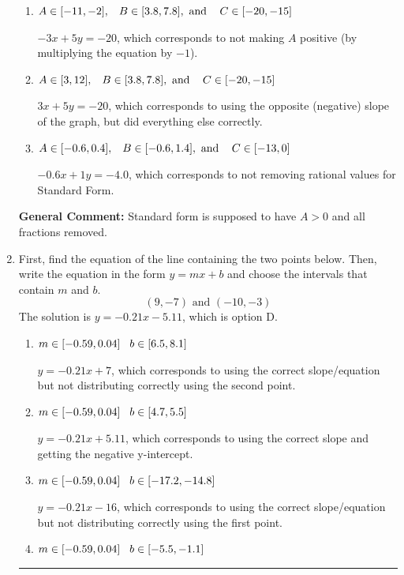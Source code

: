 \documentclass{extbook}[14pt]
\newcommand{\litem}[1]{\item #1

\rule{\textwidth}{0.4pt}}
\begin{document}
\begin{enumerate}
{\begin{enumerate}[label=\Alph*.]
 $-0.6x - 1y = 4.0$, which corresponds to using the opposite (negative) slope of the graph and not removing rational values.
\item \( A \in [-11, -2], \hspace{3mm} B \in [3.8, 7.8], \text{ and } \hspace{3mm} C \in [-20, -15] \)

 $-3x + 5y = -20$, which corresponds to not making $A$ positive (by multiplying the equation by $-1$).
\item \( A \in [3, 12], \hspace{3mm} B \in [3.8, 7.8], \text{ and } \hspace{3mm} C \in [-20, -15] \)

 $3x + 5y = -20$, which corresponds to using the opposite (negative) slope of the graph, but did everything else correctly.
\item \( A \in [-0.6, 0.4], \hspace{3mm} B \in [-0.6, 1.4], \text{ and } \hspace{3mm} C \in [-13, 0] \)

 $-0.6x + 1y = -4.0$, which corresponds to not removing rational values for Standard Form.
\end{enumerate}

\textbf{General Comment:} Standard form is supposed to have $A > 0$ and all fractions removed.
}
\litem{
First, find the equation of the line containing the two points below. Then, write the equation in the form $ y=mx+b $ and choose the intervals that contain $m$ and $b$.
\[ (9, -7) \text{ and } (-10, -3) \]The solution is \( y = -0.21x -5.11 \), which is option D.\begin{enumerate}[label=\Alph*.]
\item \( m \in [-0.59, 0.04] \hspace*{3mm} b \in [6.5, 8.1] \)

 $y = -0.21x + 7$, which corresponds to using the correct slope/equation but not distributing correctly using the second point.
\item \( m \in [-0.59, 0.04] \hspace*{3mm} b \in [4.7, 5.5] \)

 $y = -0.21x + 5.11$, which corresponds to using the correct slope and getting the negative y-intercept.
\item \( m \in [-0.59, 0.04] \hspace*{3mm} b \in [-17.2, -14.8] \)

 $y = -0.21x -16$, which corresponds to using the correct slope/equation but not distributing correctly using the first point.
\item \( m \in [-0.59, 0.04] \hspace*{3mm} b \in [-5.5, -1.1] \)


\end{enumerate}}
\end{enumerate}
\end{document}
